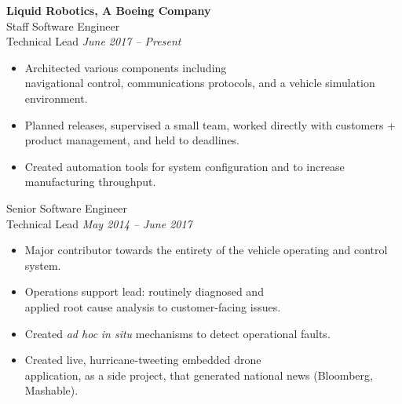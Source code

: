 \documentclass[11pt,twoside,a4paper]{article}
\begin{document}
{\begin{multicols}{2}
\begin{itemize}
                \end{itemize}
                \vspace{10px}
                \textbf{Liquid Robotics, A Boeing Company}\\
                Staff Software Engineer\\
                Technical Lead \hfill \textsl{June 2017 -- Present} \\
                \vspace{ -10px}
                \begin{itemize}[noitemsep,nolistsep]
                    \item Architected various components including \\navigational control, communications protocols, and a vehicle simulation environment.
                    \item Planned releases, supervised a small team, worked directly with customers + product management, and held to deadlines.
                    \item Created automation tools for system configuration and to increase manufacturing throughput.
                \end{itemize}
                \vspace{10px}
                Senior Software Engineer\\
                Technical Lead \hfill \textsl{May 2014 -- June 2017} \\
                \vspace{ -10px}
                \begin{itemize}[noitemsep,nolistsep]
                	\item Major contributor towards the entirety of the vehicle operating and control system.
                     \item Operations support lead: routinely diagnosed and \\applied root cause analysis to customer-facing issues.
                     \item Created \textit{ad hoc} \textit{in situ} mechanisms to detect operational faults. 
                     \item Created live, hurricane-tweeting embedded drone \\application, as a side project, that generated national news (Bloomberg, Mashable).

\end{itemize}
\end{multicols}}
\end{document}
